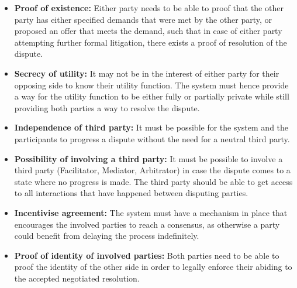 \documentclass[12pt,msc,a4paper,oneside]{ucl_thesis}
\begin{document}
\begin{itemize}

    \item{\textbf{Proof of existence:}} Either party needs to be able to proof that the other party has either specified demands that were met by the other party, or proposed an offer that meets the demand, such that in case of either party attempting further formal litigation, there exists a proof of resolution of the dispute.

    \item{\textbf{Secrecy of utility:}} It may not be in the interest of either party for their opposing side to know their utility function. The system must hence provide a way for the utility function to be either fully or partially private while still providing both parties a way to resolve the dispute.

    \item{\textbf{Independence of third party:}} It must be possible for the system and the participants to progress a dispute without the need for a neutral third party.

    \item{\textbf{Possibility of involving a third party:}} It must be possible to involve a third party (Facilitator, Mediator, Arbitrator) in case the dispute comes to a state where no progress is made. The third party should be able to get access to all interactions that have happened between disputing parties.

    \item{\textbf{Incentivise agreement:}} The system must have a mechanism in place that encourages the involved parties to reach a consensus, as otherwise a party could benefit from delaying the process indefinitely.

    \item{\textbf{Proof of identity of involved parties:}} Both parties need to be able to proof the identity of the other side in order to legally enforce their abiding to the accepted negotiated resolution.

\end{itemize}
\end{document}
